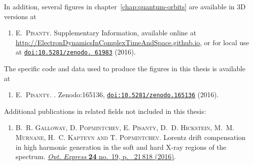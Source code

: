 \noindent
In addition, several figures in chapter~\ref{chap:quantum-orbits} are available in 3D versions at
\begin{enumerate}
\item[{\hypersetup{citecolor=black}\cite{SupplementaryInformation}}]
\textsc{E.~Pisanty}. Supplementary Information, available online at \url{http://ElectronDynamicsInComplexTimeAndSpace.github.io}, or for local use at \href{http://dx.doi.org/10.5281/zenodo.61983}{\texttt{doi:10.5281/zenodo. 61983}} (2016).
\end{enumerate}


\pagebreak

\noindent
The specific code and data used to produce the figures in this thesis is available at
\begin{enumerate}
\item[{\hypersetup{citecolor=black}\cite{FigureMakerThesis}}]
\textsc{E.~Pisanty}.
.
\newblock Zenodo:165136,
  \href{http://dx.doi.org/10.5281/zenodo.61844}{\texttt{doi:10.5281/zenodo.165136}}
  (2016).
\end{enumerate}



\noindent
Additional publications in related fields not included in this thesis:

\begin{enumerate}
\item[{\hypersetup{citecolor=black}\cite{galloway_lorentz_2016}}]
\textsc{B.~R. Galloway, D. Popmintchev, E. Pisanty, D.~D. Hickstein, M.~M. Murnane, H.~C. Kapteyn and T. Popmintchev}.
\newblock Lorentz drift compensation in high harmonic generation in the soft
  and hard {X}-ray regions of the spectrum.
  \href{https://doi.org/10.1364/OE.24.021818}{\emph{Opt. Express} \textbf{24} no.~19, p.~ 21\,818 (2016)}.
\end{enumerate}










